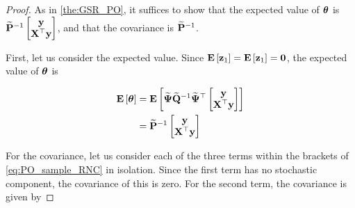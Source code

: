 \begin{proof}
As in \cref{the:GSR_PO}, it suffices to show that the expected value of $\boldsymbol{\theta}$ is $ \widetilde{\mathbf{P}}^{-1} \begin{bmatrix} \mathbf{y} \\ \mathbf{X}^\top \mathbf{y} \end{bmatrix}$, and that the covariance is  $\widetilde{\mathbf{P}}^{-1}$. 

First, let us consider the expected value. Since $\mathbf{E}\left[\mathbf{z}_1\right] = \mathbf{E}\left[\mathbf{z}_1\right] = \mathbf{0}$, the expected value of $\boldsymbol{\theta}$ is 

\begin{align*}
    \mathbf{E}\left[\boldsymbol{\theta}\right] &= \mathbf{E}\left[\widetilde{\mathbf{\Psi}} \widetilde{\mathbf{Q}}^{-1} \widetilde{\mathbf{\Psi}}^\top \begin{bmatrix} \mathbf{y} \\ \mathbf{X}^\top \mathbf{y} \end{bmatrix}\right] \\
    &= \widetilde{\mathbf{P}}^{-1} \begin{bmatrix} \mathbf{y} \\ \mathbf{X}^\top \mathbf{y} \end{bmatrix} 
\end{align*}

For the covariance, let us consider each of the three terms within the brackets of \cref{eq:PO_sample_RNC} in isolation. Since the first term has no stochastic component, the covariance of this is zero. For the second term, the covariance is given by 


\end{proof}
